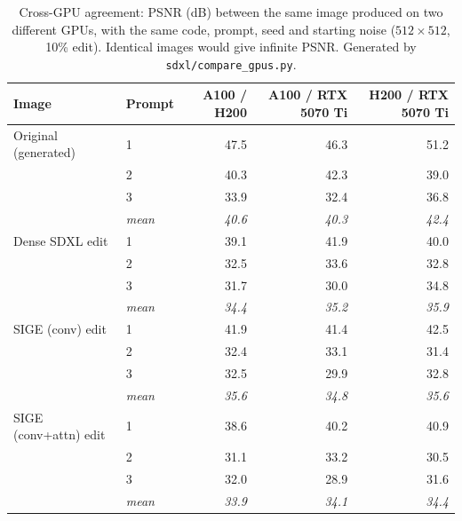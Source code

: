\begin{table}[h!]
\centering
\small
\caption{Cross-GPU agreement: PSNR (dB) between the same image produced on two different GPUs, with the same code, prompt, seed and starting noise ($512\times512$, 10\% edit). Identical images would give infinite PSNR. Generated by \texttt{sdxl/compare\_gpus.py}.}
\label{tab:app_cross_gpu}
\begin{tabular}{llrrr}
\toprule
Image & Prompt & A100 / H200 & A100 / RTX 5070 Ti & H200 / RTX 5070 Ti \\
\midrule
Original (generated) & 1 & 47.5 & 46.3 & 51.2 \\
 & 2 & 40.3 & 42.3 & 39.0 \\
 & 3 & 33.9 & 32.4 & 36.8 \\
 & \textit{mean} & \textit{40.6} & \textit{40.3} & \textit{42.4} \\
\midrule
Dense SDXL edit & 1 & 39.1 & 41.9 & 40.0 \\
 & 2 & 32.5 & 33.6 & 32.8 \\
 & 3 & 31.7 & 30.0 & 34.8 \\
 & \textit{mean} & \textit{34.4} & \textit{35.2} & \textit{35.9} \\
\midrule
SIGE (conv) edit & 1 & 41.9 & 41.4 & 42.5 \\
 & 2 & 32.4 & 33.1 & 31.4 \\
 & 3 & 32.5 & 29.9 & 32.8 \\
 & \textit{mean} & \textit{35.6} & \textit{34.8} & \textit{35.6} \\
\midrule
SIGE (conv+attn) edit & 1 & 38.6 & 40.2 & 40.9 \\
 & 2 & 31.1 & 33.2 & 30.5 \\
 & 3 & 32.0 & 28.9 & 31.6 \\
 & \textit{mean} & \textit{33.9} & \textit{34.1} & \textit{34.4} \\
\bottomrule
\end{tabular}
\end{table}

